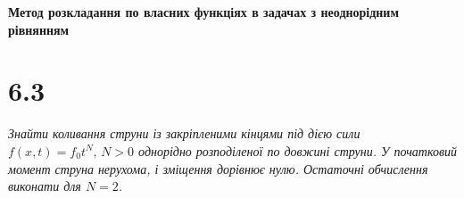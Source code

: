 

%


\textbf{\large Метод розкладання по власних функціях в задачах з неоднорідним рівнянням}

\section[Задача №6.3]{6.3}

\textit{Знайти коливання струни із закріпленими кінцями під дією сили $f(x,t) = f_0 t^N, \, N > 0$ однорідно розподіленої по довжині струни. У початковий момент струна нерухома, і зміщення дорівнює нулю. Остаточні обчислення виконати
для $N=2$.}

%
